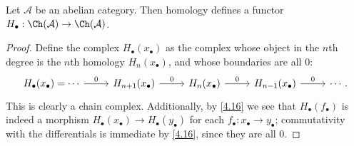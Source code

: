 \begin{corollary}\label{5.6}
	Let $\mathcal{A} $ be an abelian category. Then homology defines a functor $H_{\bullet} : \Ch(\mathcal{A} )  \to \Ch(\mathcal{A} ) $.
\end{corollary}
\begin{proof}
	Define the complex $H_{\bullet} (x_{\bullet} )$ as the complex whose object in the $n$th degree is the $n$th homology $H_n(x_{\bullet} )$, and whose boundaries are all 0:
	\[\begin{tikzcd}[row sep = 2.5em, column sep = 2.5em]
	H_{\bullet} (x_{\bullet} )=\cdots \ar[" 0 ", r] & H_{n+1} (x_{\bullet} ) \ar[" 0 ", r] & H_n(x_{\bullet} )\ar[" 0 ", r]  & H_{n-1} (x_{\bullet} )\ar[" 0 ", r]  & \cdots.
	\end{tikzcd}\]
	This is clearly a chain complex. Additionally, by \cref{4.16} we see that $H_{\bullet} (f_{\bullet} )$ is indeed a morphism $H_{\bullet} (x_{\bullet} )\to H_{\bullet} (y_{\bullet} )$ for each $f_{\bullet} : x_{\bullet}  \to y_{\bullet} $; commutativity with the differentials is immediate by \cref{4.16}, since they are all 0.
\end{proof}


